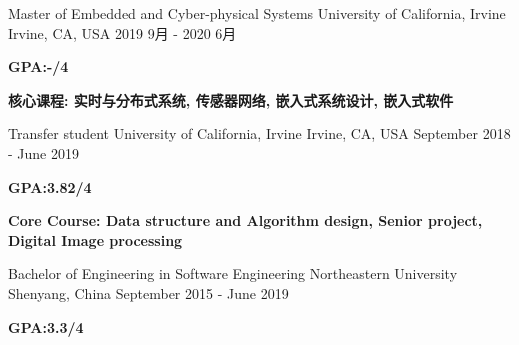 
\begin{cventries}
  \cventry
    {Master of Embedded and Cyber-physical Systems} %
    {University of California, Irvine} %
    {Irvine, CA, USA} %
    {2019 9月 - 2020 6月} %
    {
    \begin{cvitems} %
         \item {\textbf{GPA:-/4}}
         \item {\textbf{核心课程: 实时与分布式系统, 传感器网络, 嵌入式系统设计, 嵌入式软件}}
      \end{cvitems}
    }

  \cventry
    {Transfer student} %
    {University of California, Irvine} %
    {Irvine, CA, USA} %
    {September 2018 - June 2019} %
    {
      \begin{cvitems} %
         \item {\textbf{GPA:3.82/4}}
         \item {\textbf{Core Course: Data structure and Algorithm design, Senior project, Digital Image processing}}
      \end{cvitems}
    }
    
  \cventry
    {Bachelor of Engineering in Software Engineering} %
    {Northeastern University} %
    {Shenyang, China} %
    {September 2015 - June 2019} %
    {
      \begin{cvitems} %
         \item {\textbf{GPA:3.3/4}}
      \end{cvitems}
    }

\end{cventries}
